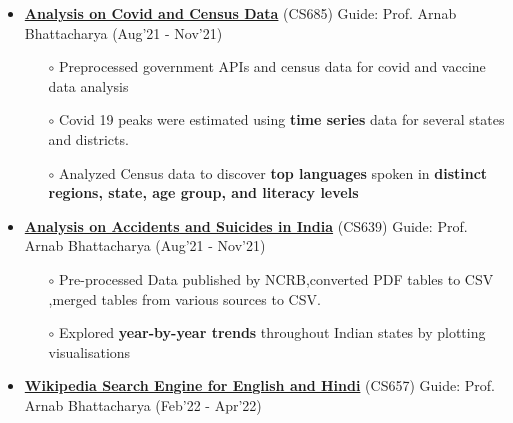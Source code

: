 \documentclass[10.8pt, a4paper]{extarticle}
\begin{document}
\begin{itemize}
\item \href{https://github.com/jeetsarangi/Census-Data-Analysis}{\textbf{Analysis on Covid and Census Data}} (CS685) Guide: Prof. Arnab Bhattacharya   \hfill(Aug'21 - Nov'21)
	\\[-0.6cm]
	\begin{itemize}
	      \item[$\circ$] Preprocessed government APIs and census data for covid and vaccine data analysis\\[-0.6cm]
    \item[$\circ$] Covid 19 peaks were estimated using \textbf{time series} data for several states and districts.\\[-0.6cm]
    \item[$\circ$] Analyzed Census data to discover \textbf{top languages} spoken in \textbf{distinct regions, state, age group, and literacy levels}\\[-0.6cm]
	\end{itemize}


	\item \href{https://github.com/jeetsarangi/Accidents-and-suicides-in-India-Analysis}{\textbf{Analysis on Accidents and Suicides in India}} (CS639) Guide: Prof. Arnab Bhattacharya \hfill(Aug'21 - Nov'21)
	\\[-0.6cm]
	\begin{itemize}
	      \item [$\circ$] Pre-processed Data published by NCRB,converted PDF tables to CSV ,merged tables from various sources to CSV.\\[-0.6cm]
	      \item [$\circ$] Explored \textbf{year-by-year trends} throughout Indian states by plotting visualisations
	      \\[-0.6cm]
	      
	\end{itemize}


\item\href{https://github.com/jeetsarangi/Wikipedia-Article-Retrieval-System} {\textbf{Wikipedia Search Engine for English and Hindi}} (CS657) Guide: Prof.  Arnab Bhattacharya   \hfill(Feb'22 - Apr'22)
	\\[-0.6cm]
	\begin{itemize}
	

\end{itemize}
\end{itemize}
\end{document}
